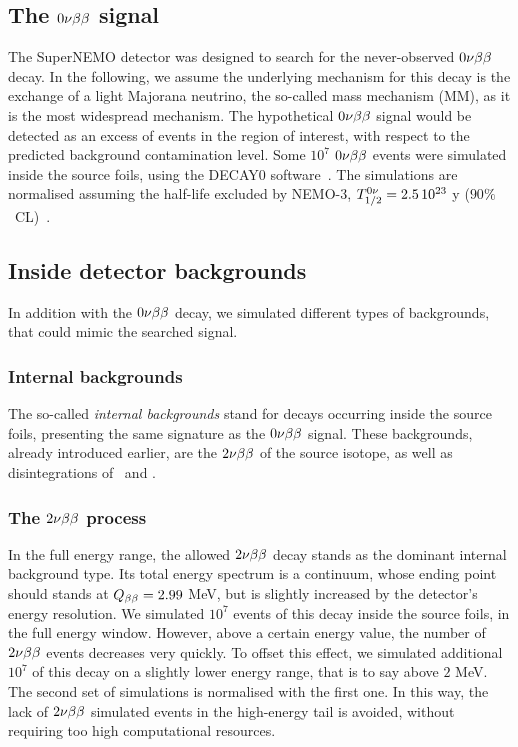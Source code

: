 
\subsection{The $0\nu\beta\beta$ signal}

The SuperNEMO detector was designed to search for the never-observed $0\nu\beta\beta$ decay.
In the following, we assume the underlying mechanism for this decay is the exchange of a light Majorana neutrino, the so-called mass mechanism (MM), as it is the most widespread mechanism.
The hypothetical $0\nu\beta\beta$ signal would be detected as an excess of events in the region of interest, with respect to the predicted background contamination level.
Some $10^{7}$ $0\nu\beta\beta$ events were simulated inside the source foils, using the DECAY$0$ software~\cite{art:decay0}.
The simulations are normalised assuming the half-life excluded by NEMO-$3$, $T_{1/2}^{0\nu} = 2.5\,10^{23}$ y ($90\%$~CL)~\cite{art:NEMO2018}.

\subsection{Inside detector backgrounds}

In addition with the $0\nu\beta\beta$ decay, we simulated different types of backgrounds, that could mimic the searched signal.

\subsubsection{Internal backgrounds}

The so-called \emph{internal backgrounds} stand for decays occurring inside the source foils, presenting the same signature as the $0\nu\beta\beta$ signal.
These backgrounds, already introduced earlier, are the $2\nu\beta\beta$ of the source isotope, as well as disintegrations of \Tl\ and \Bi.


\subsubsection*{The $2\nu\beta\beta$ process}

In the full energy range, the allowed $2\nu\beta\beta$ decay stands as the dominant internal background type.
Its total energy spectrum is a continuum, whose ending point should stands at $Q_{\beta\beta} = 2.99$ MeV, but is slightly increased by the detector's energy resolution.
We simulated $10^{7}$ events of this decay inside the source foils, in the full energy window.
However, above a certain energy value, the number of $2\nu\beta\beta$ events decreases very quickly.
To offset this effect, we simulated additional $10^{7}$ of this decay on a slightly lower energy range, that is to say above $2$ MeV.
The second set of simulations is normalised with the first one.
In this way, the lack of $2\nu\beta\beta$ simulated events in the high-energy tail is avoided, without requiring too high computational resources.

